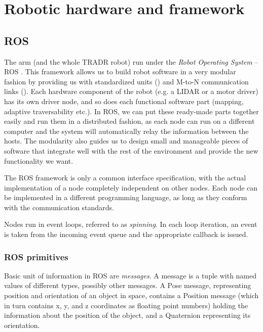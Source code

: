 \documentclass[buriama8_dp.tex]{subfiles}
\begin{document}
\chapter{Robotic hardware and framework}

\section{ROS}
\label{sec:ros}

The arm (and the whole TRADR robot) run under the \emph{Robot Operating System} – ROS \cite{ros_paper}. This framework allows us to build robot software in a very modular fashion by providing us with standardized units () and M-to-N communication links (). Each hardware component of the robot (e.g. a LIDAR or a motor driver) has its own driver node, and so does each functional software part (mapping, adaptive traversability etc.). In ROS, we can put these ready-made parts together easily and run them in a distributed fashion, as each node can run on a different computer and the system will automatically relay the information between the hosts. The modularity also guides us to design small and manageable pieces of software that integrate well with the rest of the environment and provide the new functionality we want.

The ROS framework is only a common interface specification, with the actual implementation of a node completely independent on other nodes. Each node can be implemented in a different programming language, as long as they conform with the communication standards.

Nodes run in event loops, referred to as \emph{spinning}. In each loop iteration, an event is taken from the incoming event queue and the appropriate callback is issued.

\subsection{ROS primitives}
\label{subsec:ros_prims}

Basic unit of information in ROS are \emph{messages}. A message is a tuple with named values of different types, possibly other messages. A Pose message, representing position and orientation of an object in space, contains a Position message (which in turn contains \m x, \m y, and \m z coordinates as floating point numbers) holding the information about the position of the object, and a Quaternion representing its orientation.
\end{document}
